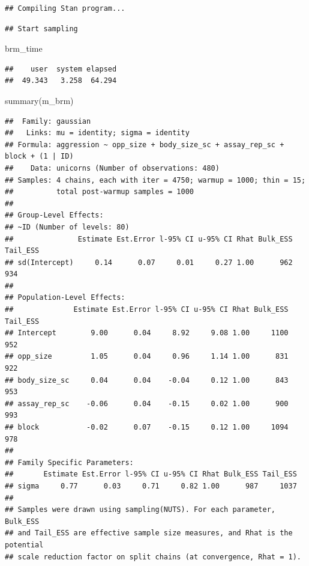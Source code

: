 \documentclass[
  12pt,
]{book}
\newenvironment{Shaded}{\begin{snugshade}}{\end{snugshade}}
\newcommand{\FunctionTok}[1]{\textcolor[rgb]{0.00,0.00,0.00}{#1}}
\newcommand{\NormalTok}[1]{#1}
\begin{document}
\begin{verbatim}
## Compiling Stan program...
\end{verbatim}

\begin{verbatim}
## Start sampling
\end{verbatim}

\begin{Shaded}
\begin{Highlighting}[]
\NormalTok{brm\_time}
\end{Highlighting}
\end{Shaded}

\begin{verbatim}
##    user  system elapsed 
##  49.343   3.258  64.294
\end{verbatim}

\begin{Shaded}
\begin{Highlighting}[]
\FunctionTok{summary}\NormalTok{(m\_brm)}
\end{Highlighting}
\end{Shaded}

\begin{verbatim}
##  Family: gaussian 
##   Links: mu = identity; sigma = identity 
## Formula: aggression ~ opp_size + body_size_sc + assay_rep_sc + block + (1 | ID) 
##    Data: unicorns (Number of observations: 480) 
## Samples: 4 chains, each with iter = 4750; warmup = 1000; thin = 15;
##          total post-warmup samples = 1000
## 
## Group-Level Effects: 
## ~ID (Number of levels: 80) 
##               Estimate Est.Error l-95% CI u-95% CI Rhat Bulk_ESS Tail_ESS
## sd(Intercept)     0.14      0.07     0.01     0.27 1.00      962      934
## 
## Population-Level Effects: 
##              Estimate Est.Error l-95% CI u-95% CI Rhat Bulk_ESS Tail_ESS
## Intercept        9.00      0.04     8.92     9.08 1.00     1100      952
## opp_size         1.05      0.04     0.96     1.14 1.00      831      922
## body_size_sc     0.04      0.04    -0.04     0.12 1.00      843      953
## assay_rep_sc    -0.06      0.04    -0.15     0.02 1.00      900      993
## block           -0.02      0.07    -0.15     0.12 1.00     1094      978
## 
## Family Specific Parameters: 
##       Estimate Est.Error l-95% CI u-95% CI Rhat Bulk_ESS Tail_ESS
## sigma     0.77      0.03     0.71     0.82 1.00      987     1037
## 
## Samples were drawn using sampling(NUTS). For each parameter, Bulk_ESS
## and Tail_ESS are effective sample size measures, and Rhat is the potential
## scale reduction factor on split chains (at convergence, Rhat = 1).
\end{verbatim}
\end{document}
